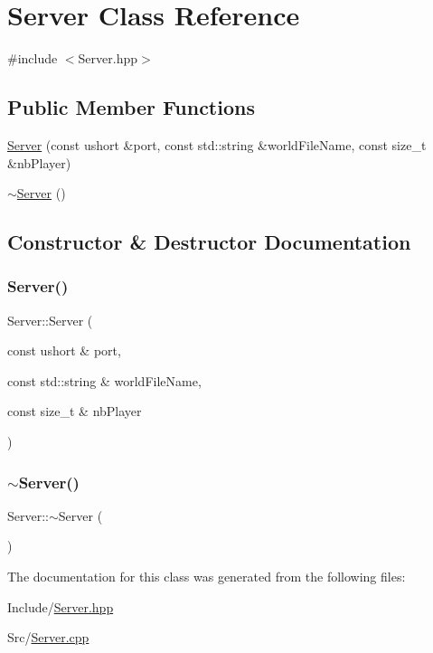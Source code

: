 \hypertarget{class_server}{}\section{Server Class Reference}
\label{class_server}


{\ttfamily \#include $<$Server.\+hpp$>$}

\subsection*{Public Member Functions}
\begin{DoxyCompactItemize}
\item 
\mbox{\hyperlink{class_server_a453085c2b2def0009b5e741f8f07f092}{Server}} (const ushort \&port, const std\+::string \&world\+File\+Name, const size\+\_\+t \&nb\+Player)
\item 
\mbox{\hyperlink{class_server_a4b3aa2579cb1c8cd1d069582c14d0fa6}{$\sim$\+Server}} ()
\end{DoxyCompactItemize}


\subsection{Constructor \& Destructor Documentation}
\mbox{\label{class_server_a453085c2b2def0009b5e741f8f07f092}} 
\subsubsection{\texorpdfstring{Server()}{Server()}}
{\footnotesize\ttfamily Server\+::\+Server (\begin{DoxyParamCaption}\item[{const ushort \&}]{port,  }\item[{const std\+::string \&}]{world\+File\+Name,  }\item[{const size\+\_\+t \&}]{nb\+Player }\end{DoxyParamCaption})}

\mbox{\label{class_server_a4b3aa2579cb1c8cd1d069582c14d0fa6}} 
\subsubsection{\texorpdfstring{$\sim$Server()}{~Server()}}
{\footnotesize\ttfamily Server\+::$\sim$\+Server (\begin{DoxyParamCaption}{ }\end{DoxyParamCaption})}



The documentation for this class was generated from the following files\+:\begin{DoxyCompactItemize}
\item 
Include/\mbox{\hyperlink{_server_8hpp}{Server.\+hpp}}\item 
Src/\mbox{\hyperlink{_server_8cpp}{Server.\+cpp}}\end{DoxyCompactItemize}
